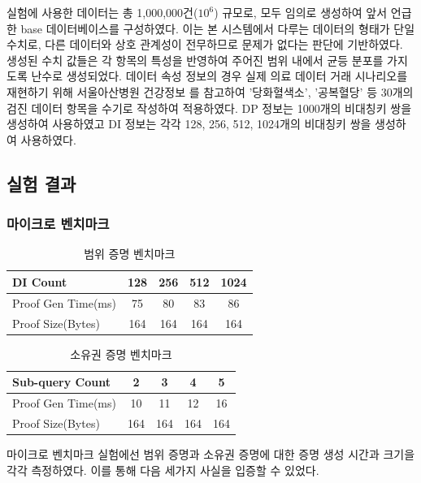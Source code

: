 \bigskip

실험에 사용한 데이터는 총 1,000,000건($10^6$) 규모로, 모두 임의로 생성하여 앞서 언급한 base 데이터베이스를 구성하였다. 이는 본 시스템에서 다루는 데이터의 형태가 단일 수치로, 다른 데이터와 상호 관계성이 전무하므로 문제가 없다는 판단에 기반하였다. 생성된 수치 값들은 각 항목의 특성을 반영하여 주어진 범위 내에서 균등 분포를 가지도록 난수로 생성되었다. 데이터 속성 정보의 경우 실제 의료 데이터 거래 시나리오를 재현하기 위해 서울아산병원 건강정보 \cite{asan2014}를 참고하여 '당화혈색소', '공복혈당' 등 30개의 검진 데이터 항목을 수기로 작성하여 적용하였다. DP 정보는 1000개의 비대칭키 쌍을 생성하여 사용하였고 DI 정보는 각각 128, 256, 512, 1024개의 비대칭키 쌍을 생성하여 사용하였다.

\subsection{실험 결과}

\subsubsection{마이크로 벤치마크}

\begin{table}[h]
    \footnotesize
    \centering
    \caption{범위 증명 벤치마크}
    \begin{tabular}{p{3cm}|c|c|c|c}
        \hline
        DI Count & 128 & 256 & 512 & 1024 \\
        \hline
        Proof Gen Time(ms) & 75 & 80 & 83 & 86 \\
        Proof Size(Bytes) & 164 & 164 & 164 & 164 \\
        \hline
    \end{tabular}
\end{table}

\begin{table}[h]
    \footnotesize
    \centering
    \caption{소유권 증명 벤치마크}
    \begin{tabular}{p{3cm}|c|c|c|c}
        \hline
        Sub-query Count& 2 & 3 & 4 & 5 \\
        \hline
        Proof Gen Time(ms) & 10 & 11 & 12 & 16 \\
        Proof Size(Bytes) & 164 & 164 & 164 & 164 \\
        \hline
    \end{tabular}
\end{table}

마이크로 벤치마크 실험에선 범위 증명과 소유권 증명에 대한 증명 생성 시간과 크기을 각각 측정하였다. 이를 통해 다음 세가지 사실을 입증할 수 있었다.

